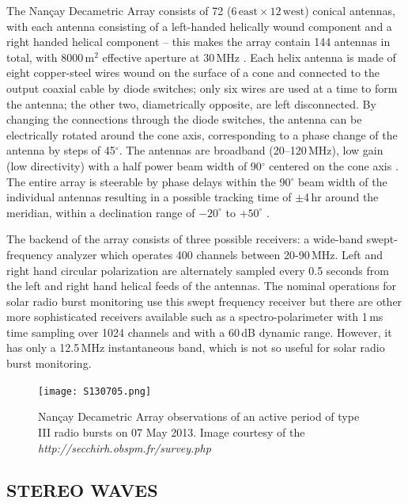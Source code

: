 The Nan\c{c}ay Decametric Array consists of 72 ($6\,\mathrm{east} \times12\,\mathrm{west}$) conical antennas, with each antenna consisting of a left-handed helically wound component and a right handed helical component -- this makes the array contain 144 antennas in total, with 8000\,m$^2$ effective aperture at 30\,MHz \citep{lecacheux2000}. Each helix antenna is made of eight copper-steel wires wound on the surface of a cone and connected to the output coaxial cable by diode switches; only six wires are used at a time to form the antenna; the other two, diametrically opposite, are left disconnected. By changing the connections through the diode switches, the antenna can be electrically rotated around the cone axis, corresponding to a phase change of the antenna by steps of 45$^{\circ}$. The antennas are broadband (20--120\,MHz), low gain (low directivity) with a half power beam width of 90$^{\circ}$ centered on the cone axis \citep{boischot1980}. The entire array is steerable by phase delays within the 90$^{\circ}$  beam width of the individual antennas resulting in a possible tracking time of $\pm$4\,hr around the meridian, within a declination range of $-20^{\circ}$ to $+50^{\circ}$ .

The backend of the array consists of three possible receivers: a wide-band swept-frequency analyzer which operates 400 channels between 20-90\,MHz. Left and right hand circular polarization are alternately sampled every 0.5 seconds from the left and right hand helical feeds of the antennas. The nominal operations for solar radio burst monitoring use this swept frequency receiver but there are other more sophisticated receivers available such as a spectro-polarimeter with 1\,ms time sampling over 1024 channels and with a 60\,dB dynamic range. However, it has only a 12.5\,MHz instantaneous band, which is not so useful for solar radio burst monitoring.
\begin{figure}[!t]
\begin{center}
\texttt{[image: S130705.png]}
\caption[Nan\c{c}ay Decametric Array observations]{Nan\c{c}ay Decametric Array observations of an active period of type III radio bursts on 07 May 2013. Image courtesy of the {\it http://secchirh.obspm.fr/survey.php}}
\end{center}
\end{figure}

\subsection{STEREO WAVES}\label{sec:31}

